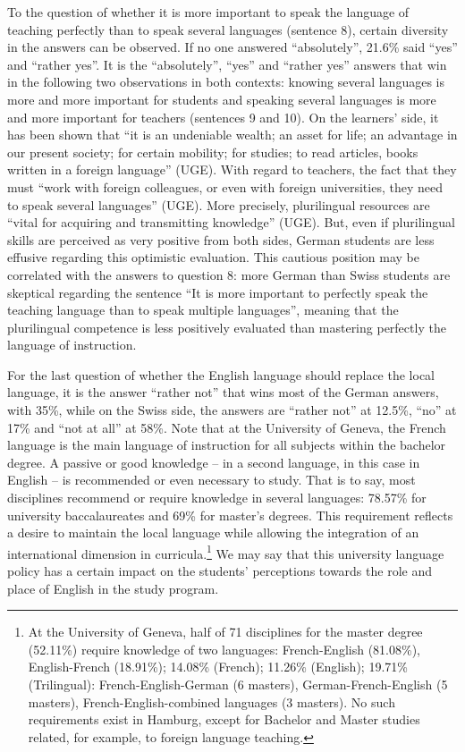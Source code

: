 \documentclass[output=paper]{../langscibook}
\begin{document}
To the question of whether it is more important to speak the language of teaching perfectly than to speak several languages (sentence 8), certain diversity in the answers can be observed. If no one answered “absolutely”, 21.6\% said “yes” and “rather yes”. It is the “absolutely”, “yes” and “rather yes” answers that win in the following two observations in both contexts: knowing several languages is more and more important for students and speaking several languages is more and more important for teachers (sentences 9 and 10). On the learners’ side, it has been shown that “it is an undeniable wealth; an asset for life; an advantage in our present society; for certain mobility; for studies; to read articles, books written in a foreign language” (UGE). With regard to teachers, the fact that they must “work with foreign colleagues, or even with foreign universities, they need to speak several languages” (UGE). More precisely, plurilingual resources are “vital for acquiring and transmitting knowledge” (UGE). But, even if plurilingual skills are perceived as very positive from both sides, German students are less effusive regarding this optimistic evaluation. This cautious position may be correlated with the answers to question 8: more German than Swiss students are skeptical regarding the sentence “It is more important to perfectly speak the teaching language than to speak multiple languages”, meaning that the plurilingual competence is less positively evaluated than mastering perfectly the language of instruction. 

For the last question of whether the English language should replace the local language, it is the answer “rather not” that wins most of the German answers, with 35\%, while on the Swiss side, the answers are “rather not” at 12.5\%, “no” at 17\% and “not at all” at 58\%. Note that at the University of Geneva, the French language is the main language of instruction for all subjects within the bachelor degree. A passive or good knowledge – in a second language, in this case in English – is recommended or even necessary to study. That is to say, most disciplines recommend or require knowledge in several languages: 78.57\% for university baccalaureates and 69\% for master’s degrees. This requirement reflects a desire to maintain the local language while allowing the integration of an international dimension in curricula.\footnote{At the University of Geneva, half of 71 disciplines for the master degree (52.11\%) require knowledge of two languages: French-English (81.08\%), English-French (18.91\%); 14.08\% (French); 11.26\% (English); 19.71\% (Trilingual): French-English-German (6 masters), German-French-English (5 masters), French-English-combined languages (3 masters). No such requirements exist in Hamburg, except for Bachelor and Master studies related, for example, to foreign language teaching.} We may say that this university language policy has a certain impact on the students’ perceptions towards the role and place of English in the study program.
\end{document}
